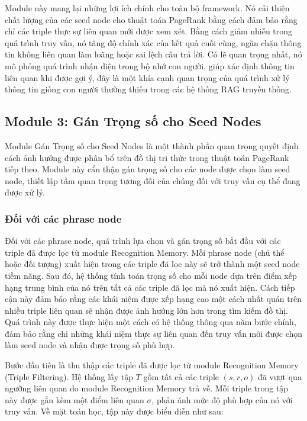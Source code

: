\documentclass[../main.tex]{subfiles}
\begin{document}
Module này mang lại những lợi ích chính cho toàn bộ framework. Nó cải thiện chất lượng của các seed node cho thuật toán PageRank bằng cách đảm bảo rằng chỉ các triple thực sự liên quan mới được xem xét. Bằng cách giảm nhiễu trong quá trình truy vấn, nó tăng độ chính xác của kết quả cuối cùng, ngăn chặn thông tin không liên quan làm loãng hoặc sai lệch câu trả lời. Có lẽ quan trọng nhất, nó mô phỏng quá trình nhận diện trong bộ nhớ con người, giúp xác định thông tin liên quan khi được gợi ý, đây là một khía cạnh quan trọng của quá trình xử lý thông tin giống con người thường thiếu trong các hệ thống RAG truyền thống.

\subsection{Module 3: Gán Trọng số cho Seed Nodes}
Module Gán Trọng số cho Seed Nodes là một thành phần quan trọng quyết định cách ảnh hưởng được phân bổ trên đồ thị tri thức trong thuật toán PageRank tiếp theo. Module này cẩn thận gán trọng số cho các node được chọn làm seed node, thiết lập tầm quan trọng tương đối của chúng đối với truy vấn cụ thể đang được xử lý.

\subsubsection{Đối với các phrase node}

Đối với các phrase node, quá trình lựa chọn và gán trọng số bắt đầu với các triple đã được lọc từ module Recognition Memory. Mỗi phrase node (chủ thể hoặc đối tượng) xuất hiện trong các triple đã lọc này sẽ trở thành một seed node tiềm năng. Sau đó, hệ thống tính toán trọng số cho mỗi node dựa trên điểm xếp hạng trung bình của nó trên tất cả các triple đã lọc mà nó xuất hiện. Cách tiếp cận này đảm bảo rằng các khái niệm được xếp hạng cao một cách nhất quán trên nhiều triple liên quan sẽ nhận được ảnh hưởng lớn hơn trong tìm kiếm đồ thị. Quá trình này được thực hiện một cách có hệ thống thông qua năm bước chính, đảm bảo rằng chỉ những khái niệm thực sự liên quan đến truy vấn mới được chọn làm seed node và nhận được trọng số phù hợp.

Bước đầu tiên là thu thập các triple đã được lọc từ module Recognition Memory (Triple Filtering). Hệ thống lấy tập \(T\) gồm tất cả các triple \((s, r, o)\) đã vượt qua ngưỡng liên quan do module Recognition Memory trả về. Mỗi triple trong tập này được gắn kèm một điểm liên quan \(\sigma\), phản ánh mức độ phù hợp của nó với truy vấn. Về mặt toán học, tập này được biểu diễn như sau:
\end{document}
